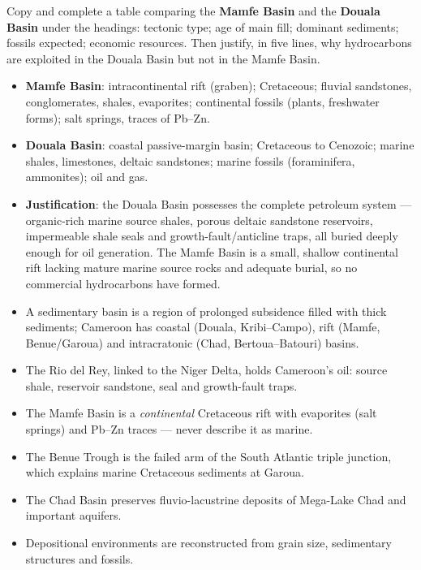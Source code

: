 \documentclass[11pt]{article}
\begin{document}
\begin{exercice}
Copy and complete a table comparing the \textbf{Mamfe Basin} and the \textbf{Douala Basin} under the headings: tectonic type; age of main fill; dominant sediments; fossils expected; economic resources. Then justify, in five lines, why hydrocarbons are exploited in the Douala Basin but not in the Mamfe Basin.
\end{exercice}

\begin{corrige}[Exercise 1]
\begin{itemize}
\item \textbf{Mamfe Basin}: intracontinental rift (graben); Cretaceous; fluvial sandstones, conglomerates, shales, evaporites; continental fossils (plants, freshwater forms); salt springs, traces of Pb--Zn.
\item \textbf{Douala Basin}: coastal passive-margin basin; Cretaceous to Cenozoic; marine shales, limestones, deltaic sandstones; marine fossils (foraminifera, ammonites); oil and gas.
\item \textbf{Justification}: the Douala Basin possesses the complete petroleum system --- organic-rich marine source shales, porous deltaic sandstone reservoirs, impermeable shale seals and growth-fault/anticline traps, all buried deeply enough for oil generation. The Mamfe Basin is a small, shallow continental rift lacking mature marine source rocks and adequate burial, so no commercial hydrocarbons have formed.
\end{itemize}
\end{corrige}

\begin{aretenir}
\begin{itemize}
\item A sedimentary basin is a region of prolonged subsidence filled with thick sediments; Cameroon has coastal (Douala, Kribi--Campo), rift (Mamfe, Benue/Garoua) and intracratonic (Chad, Bertoua--Batouri) basins.
\item The Rio del Rey, linked to the Niger Delta, holds Cameroon's oil: source shale, reservoir sandstone, seal and growth-fault traps.
\item The Mamfe Basin is a \emph{continental} Cretaceous rift with evaporites (salt springs) and Pb--Zn traces --- never describe it as marine.
\item The Benue Trough is the failed arm of the South Atlantic triple junction, which explains marine Cretaceous sediments at Garoua.
\item The Chad Basin preserves fluvio-lacustrine deposits of Mega-Lake Chad and important aquifers.
\item Depositional environments are reconstructed from grain size, sedimentary structures and fossils.
\end{itemize}
\end{aretenir}
\end{document}
